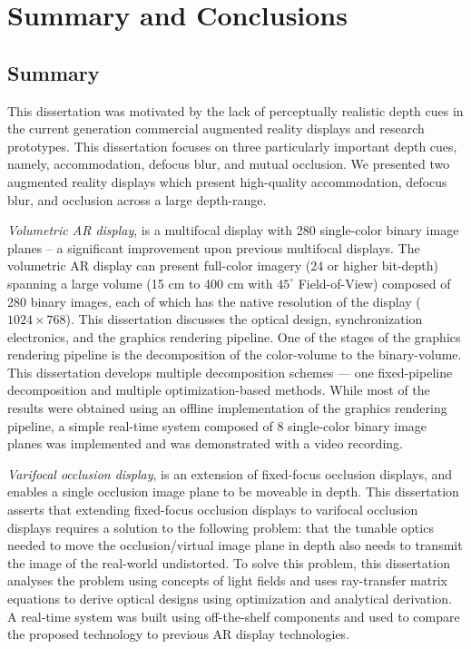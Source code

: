 \chapter{Summary and Conclusions}
\label{chapter:summary}
\section{Summary}

This dissertation was motivated by the lack of perceptually realistic depth cues in the current generation commercial augmented reality displays and research prototypes. This dissertation focuses on three particularly important depth cues, namely, accommodation, defocus blur, and mutual occlusion. We presented two augmented reality displays which present high-quality accommodation, defocus blur, and occlusion across a large depth-range.

\emph{Volumetric AR display}, is a multifocal display with 280 single-color binary image planes – a significant improvement upon previous multifocal displays. The volumetric AR display can present full-color imagery (24 or higher bit-depth) spanning a large volume (15 cm to 400 cm with $45^\circ$ Field-of-View) composed of 280 binary images, each of which has the native resolution of the display ($1024 \times 768$). This dissertation discusses the optical design, synchronization electronics, and the graphics rendering pipeline. One of the stages of the graphics rendering pipeline is the decomposition of the color-volume to the binary-volume. This dissertation develops multiple decomposition schemes --- one fixed-pipeline decomposition and multiple optimization-based methods. While most of the results were obtained using an offline implementation of the graphics rendering pipeline, a simple real-time system composed of 8 single-color binary image planes was implemented and was demonstrated with a video recording. 

\emph{Varifocal occlusion display}, is an extension of fixed-focus occlusion displays, and enables a single occlusion image plane to be moveable in depth. This dissertation asserts that extending fixed-focus occlusion displays to varifocal occlusion displays requires a solution to the following problem: that the tunable optics needed to move the occlusion/virtual image plane in depth also needs to transmit the image of the real-world undistorted. To solve this problem, this dissertation analyses the problem using concepts of light fields and uses ray-transfer matrix equations to derive optical designs using optimization and analytical derivation. A real-time system was built using off-the-shelf components and used to compare the proposed technology to previous AR display technologies.

